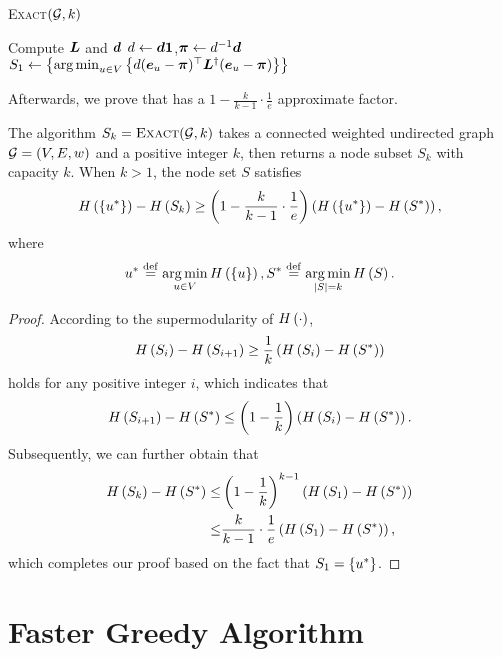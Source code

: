 \documentclass[sigconf]{acmart}
\begin{document}
\begin{algorithm}
    \caption{\textsc{Exact}\((\mathcal{G},k)\)}
    \label{algo:exact}
    Compute \(\boldsymbol{L}\) and \(\boldsymbol{d}\)\;
    \(d\gets\boldsymbol{d}\boldsymbol{1}\),\(\boldsymbol{\pi}\gets d^{-1}\boldsymbol{d}\)\;
    \(S_1\gets\left\{\operatorname*{arg\,min}_{u\in V}\left\{d(\boldsymbol{e}_u-\boldsymbol{\pi})^\top\boldsymbol{L}^\dagger(\boldsymbol{e}_u-\boldsymbol{\pi}) \right\} \right\}\)\;
\end{algorithm}

Afterwards, we prove that  has a \(1-\frac{k}{k-1}\cdot\frac{1}{e}\) approximate factor.
\begin{theorem}
    The algorithm \(S_k=\textsc{Exact}(\mathcal{G},k)\) takes a connected weighted undirected graph \(\mathcal{G}=(V,E,w)\) and a positive integer \(k\), then returns a node subset \(S_k\) with capacity \(k\).
    When \(k>1\), the node set \(S\) satisfies
    \[H\left(\left\{u^* \right\}\right)-H\left(S_k\right)\ge\left( 1-\frac{k}{k-1}\cdot\frac{1}{e} \right)\left( H\left(\left\{u^* \right\}\right)-H\left(S^*\right) \right),\]
    where
    \[u^*\stackrel{\mathrm{def}}{=}\operatorname*{arg\,min}_{u\in V}H\left(\left\{u \right\}\right),S^*\stackrel{\mathrm{def}}{=}\operatorname*{arg\,min}_{\left|S \right|=k}H\left(S\right).\]
\end{theorem}
\begin{proof}
    According to the supermodularity of \(H\left(\cdot\right)\),
    \[H\left(S_i\right)-H\left(S_{i+1}\right)\ge\frac{1}{k}\left( H\left(S_i\right)-H\left(S^*\right) \right)\]
    holds for any positive integer \(i\), which indicates that
    \[H\left(S_{i+1}\right)-H\left(S^*\right)\le\left( 1-\frac{1}{k} \right)\left( H\left(S_i\right)-H\left(S^*\right) \right).\]
    Subsequently, we can further obtain that
    \begin{align*}
        H\left(S_k\right)-H\left(S^*\right)\le & \left( 1-\frac{1}{k} \right)^{k-1}\left( H\left(S_1\right)-H\left(S^*\right) \right)    \\
        \le                      & \frac{k}{k-1}\cdot\frac{1}{e}\left( H\left(S_1\right)-H\left(S^*\right) \right),
    \end{align*}
    which completes our proof based on the fact that \(S_1=\left\{u^* \right\}\).
\end{proof}

\section{Faster Greedy Algorithm}\label{sec:faster-greedy}
\end{document}
